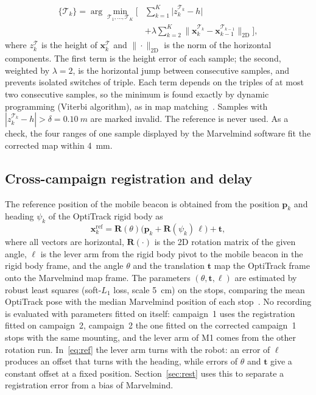 \documentclass[conference]{IEEEtran}
\begin{document}
\begin{equation}
  \begin{split}
    \{\mathcal{T}_k\} = \arg\min_{\mathcal{T}_1,\dots,\mathcal{T}_K}
    \Big[ & \sum_{k=1}^{K} \big|z_k^{\mathcal{T}_k}-h\big| \\
    & + \lambda\sum_{k=2}^{K} \big\|\mathbf{x}_k^{\mathcal{T}_k}-\mathbf{x}_{k-1}^{\mathcal{T}_{k-1}}\big\|_{\mathrm{2D}} \Big],
  \end{split}
  \label{eq:viterbi}
\end{equation}
where $z_k^{\mathcal{T}}$ is the height of $\mathbf{x}_k^{\mathcal{T}}$ and
$\|\cdot\|_{\mathrm{2D}}$ is the norm of the horizontal components. The first term is the height
error of each sample; the second, weighted by $\lambda=2$, is the horizontal jump between consecutive
samples, and prevents isolated switches of triple. Each term depends on the triples of at most two
consecutive samples, so the minimum is found exactly by dynamic programming (Viterbi algorithm), as in
map matching~\cite{newson2009hidden}. Samples with $|z_k^{\mathcal{T}_k}-h|>\delta=\SI{0.10}{m}$ are
marked invalid. The reference is never used. As a check, the four ranges of one sample displayed by the
Marvelmind software fit the corrected map within \SI{4}{mm}.

\subsection{Cross-campaign registration and delay}\label{sec:registration}
The reference position of the mobile beacon is obtained from the position $\mathbf{p}_k$ and heading
$\psi_k$ of the OptiTrack rigid body as
\begin{equation}
  \mathbf{x}_k^{\mathrm{ref}} = \mathbf{R}(\theta)\big(\mathbf{p}_k+\mathbf{R}(\psi_k)\,\boldsymbol{\ell}\big)+\mathbf{t},
  \label{eq:ref}
\end{equation}
where all vectors are horizontal, $\mathbf{R}(\cdot)$ is the 2D rotation matrix of the given angle,
$\boldsymbol{\ell}$ is the lever arm from the rigid body pivot to the mobile beacon in the rigid body
frame, and the angle $\theta$ and the translation $\mathbf{t}$ map the OptiTrack frame onto the
Marvelmind map frame. The parameters $(\theta,\mathbf{t},\boldsymbol{\ell})$ are estimated by
robust least squares (soft-$L_1$ loss, scale \SI{5}{cm}) on the stops, comparing the mean OptiTrack pose
with the median Marvelmind position of each stop~\cite{umeyama1991least}. No recording is evaluated with
parameters fitted on itself: campaign~1 uses the registration fitted on campaign~2, campaign~2 the one
fitted on the corrected campaign~1 stops with the same mounting, and the lever arm of M1 comes from the
other rotation run. In~\eqref{eq:ref} the lever arm turns with the robot: an error of
$\boldsymbol{\ell}$ produces an offset that turns with the heading, while errors of $\theta$ and
$\mathbf{t}$ give a constant offset at a fixed position. Section~\ref{sec:rest} uses this to separate a
registration error from a bias of Marvelmind.
\end{document}
